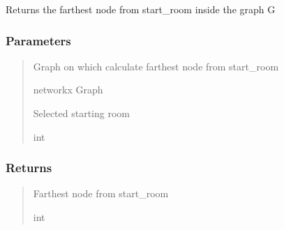\documentclass[letterpaper,10pt,english]{sphinxmanual}
\begin{document}
\begin{fulllineitems}
\label{\detokenize{api_reference/dungeon_resolver/generate_dungeon_problem:generate_dungeon_problem.farthest_node}}
\pysigstartsignatures
{}
\pysigstopsignatures
\sphinxAtStartPar
Returns the farthest node from start\_room inside the graph G


\subsubsection{Parameters}
\label{\detokenize{api_reference/dungeon_resolver/generate_dungeon_problem:parameters}}\begin{quote}\begin{description}
\sphinxAtStartPar
Graph on which calculate farthest node from start\_room

\sphinxAtStartPar
networkx Graph

\sphinxAtStartPar
Selected starting room

\sphinxAtStartPar
int

\end{description}\end{quote}


\subsubsection{Returns}
\label{\detokenize{api_reference/dungeon_resolver/generate_dungeon_problem:returns}}\begin{quote}\begin{description}
\sphinxAtStartPar
Farthest node from start\_room

\sphinxAtStartPar
int

\end{description}\end{quote}

\end{fulllineitems}

\end{document}
